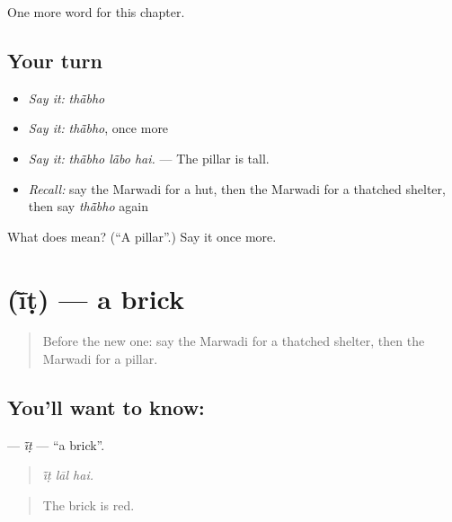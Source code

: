 \begin{grammarlens}[title={What you've built}]
One more word for this chapter.
\end{grammarlens}

\subsection*{Your turn}
\begin{itemize}
\raggedright
  \item \emph{Say it:} \emph{thā̃bho}
  \item \emph{Say it:} \emph{thā̃bho}, once more
  \item \emph{Say it:} \emph{thā̃bho lā̃bo hai.} — The pillar is tall.
  \item \emph{Recall:} say the Marwadi for a hut, then the Marwadi for a thatched shelter, then say \emph{thā̃bho} again
\end{itemize}

\begin{tcolorbox}[breakable,colback=teal!4,colframe=teal!35!black,title={Before you move on}]
What does  mean? (\textquotedblleft{}A pillar\textquotedblright{}.) Say it once more.
\end{tcolorbox}
\section[\texorpdfstring{\mw{ईंट} (ī̃ṭ)}{ईंट (ī̃ṭ)}]{ (ī̃ṭ) — a brick}

\label{lesson:MW-C189-it}



\begin{quote}
Before the new one: say the Marwadi for a thatched shelter, then the Marwadi for a pillar.
\end{quote}

\subsection*{You'll want to know: }
\textbf{} — \emph{ī̃ṭ} — \textquotedblleft{}a brick\textquotedblright{}.

\begin{quote}
  
\end{quote}

\begin{quote}
\emph{ī̃ṭ lāl hai.}
\end{quote}

\begin{quote}
The brick is red.
\end{quote}

